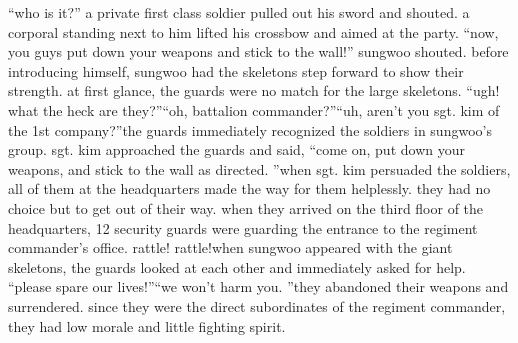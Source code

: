 “who is it?” a private first class soldier pulled out his sword and shouted.
a corporal standing next to him lifted his crossbow and aimed at the party.
“now, you guys put down your weapons and stick to the wall!” sungwoo shouted.
before introducing himself, sungwoo had the skeletons step forward to show their strength.
 at first glance, the guards were no match for the large skeletons.
“ugh! what the heck are they?”“oh, battalion commander?”“uh, aren’t you sgt.
 kim of the 1st company?”the guards immediately recognized the soldiers in sungwoo’s group.
sgt.
 kim approached the guards and said, “come on, put down your weapons, and stick to the wall as directed.
”when sgt.
 kim persuaded the soldiers, all of them at the headquarters made the way for them helplessly.
 they had no choice but to get out of their way.
when they arrived on the third floor of the headquarters, 12 security guards were guarding the entrance to the regiment commander’s office.
rattle! rattle!when sungwoo appeared with the giant skeletons, the guards looked at each other and immediately asked for help.
“please spare our lives!”“we won’t harm you.
”they abandoned their weapons and surrendered.
 since they were the direct subordinates of the regiment commander, they had low morale and little fighting spirit.

